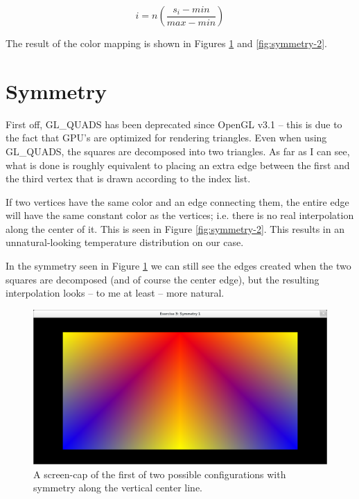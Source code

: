 \documentclass[a4paper, english, 12pt]{article}
\begin{document}
\begin{equation}
	\label{eq:algorithm}
	i = n \left( \frac{s_i - min}{max - min} \right)
\end{equation}

The result of the color mapping is shown in Figures \ref{fig:symmetry-1} and \ref{fig:symmetry-2}.

\section{Symmetry}
\label{sec:symmetry}
First off, GL\_QUADS has been deprecated since OpenGL v3.1 -- this is due to the fact that GPU's are optimized for rendering triangles. Even when using GL\_QUADS, the squares are decomposed into two triangles. As far as I can see, what is done is roughly equivalent to placing an extra edge between the first and the third vertex that is drawn according to the index list.

If two vertices have the same color and an edge connecting them, the entire edge will have the same constant color as the vertices; i.e. there is no real interpolation along the center of it. This is seen in Figure \ref{fig:symmetry-2}. This results in an unnatural-looking temperature distribution on our case.

In the symmetry seen in Figure \ref{fig:symmetry-1} we can still see the edges created when the two squares are decomposed (and of course the center edge), but the resulting interpolation looks -- to me at least -- more natural.
\begin{figure}[p]
\centering
\includegraphics[width=\textwidth]{figures/symmetry-1.png}
\caption{A screen-cap of the first of two possible configurations with symmetry along the vertical center line.}
\label{fig:symmetry-1}
\end{figure}
\end{document}

